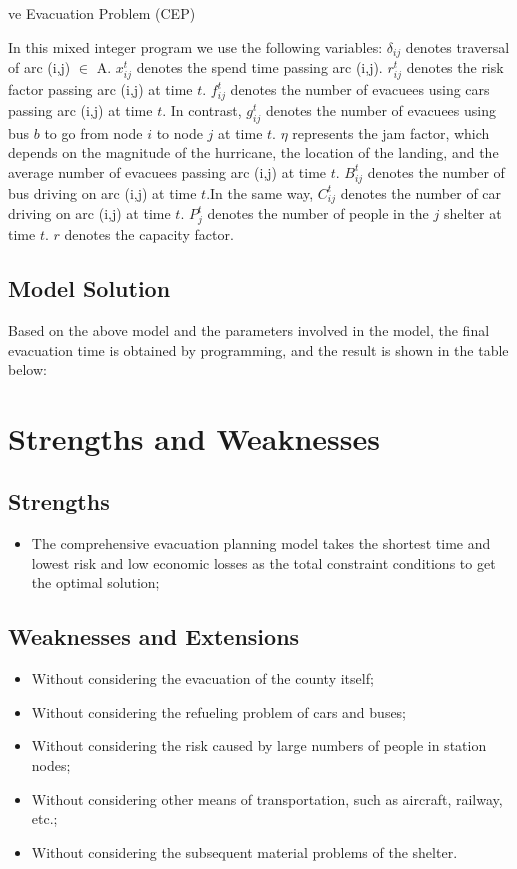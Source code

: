 \documentclass{mcmthesis}
\begin{document}
ve Evacuation Problem (CEP)\cite{Murray2013Evacuation,Ng2015Sharp,Ng2010Reliable}

In this mixed integer program we use the following variables: $\delta _{ij}$ denotes traversal of arc (i,j) $ \in $ A. $x_{ij}^t$ denotes the spend time passing arc (i,j). $r_{ij}^t$ denotes the risk factor passing arc (i,j) at time $t$. $f_{ij}^t$ denotes the number of evacuees using cars passing arc (i,j) at time $t$. In contrast, $g_{ij}^t$ denotes the number of evacuees using bus $b$ to go from node $i$ to node $j$ at time $t$. $\eta $ represents the jam factor, which depends on the magnitude of the hurricane, the location of the landing, and the average number of evacuees passing arc (i,j) at time $t$. $B_{ij}^t$ denotes the number of bus driving on arc (i,j) at time $t$.In the same way, $C_{ij}^t$ denotes the number of car driving on arc (i,j) at time $t$. $P_j^t$  denotes the number of people in the $j$ shelter at time $t$. $r$ denotes the capacity factor.


\subsection{Model Solution}
Based on the above model and the parameters involved in the model, the final evacuation time is obtained by programming, and the result is shown in the table below:


\section{Strengths and Weaknesses}

\subsection{Strengths}

\begin{itemize}
  \item The comprehensive evacuation planning model takes the shortest time and lowest risk and low economic losses as the total constraint conditions to get the optimal solution;
\end{itemize}

\subsection{Weaknesses and Extensions}
\begin{itemize}
  \item Without considering the evacuation of the county itself;
  \item Without considering the refueling problem of cars and buses;
  \item Without considering the risk caused by large numbers of people in station nodes;
  \item Without considering other means of transportation, such as aircraft, railway, etc.;
  \item Without considering the subsequent material problems of the shelter.
\end{itemize}
\end{document}
